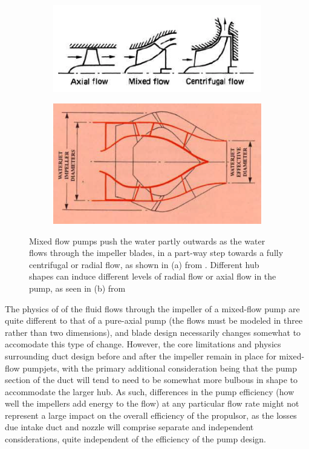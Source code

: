 \documentclass{article}\usepackage[]{graphicx}\usepackage[]{color}
\begin{document}
\begin{figure}[h]

\begin{subfigure}{0.5\textwidth}
\includegraphics[width=0.9\linewidth]{AxialMixed.png}
\caption{}
\end{subfigure}
\begin{subfigure}{0.5\textwidth}
\includegraphics[width=0.9\linewidth]{MixedHub.png}
\caption{}
\end{subfigure}

\caption{Mixed flow pumps push the water partly outwards as the water flows through the impeller blades, in a part-way step towards a fully centrifugal or radial flow, as shown in (a) from \cite{carlton2007}. Different hub shapes can induce different levels of radial flow or axial flow in the pump, as seen in (b) from \cite{hamilton1997}}
\label{fig:AxialMixedHub.png}
\end{figure}


The physics of of the fluid flows through the impeller of a mixed-flow pump are quite different to that of a pure-axial pump (the flows must be modeled in three rather than two dimensions), and blade design necessarily changes somewhat to accomodate this type of change.  However, the core limitations and physics surrounding duct design before and after the impeller remain in place for mixed-flow pumpjets, with the primary additional consideration being that the pump section of the duct will tend to need to be somewhat more bulbous in shape to accommodate the larger hub.  As such, differences in the pump efficiency (how well the impellers add energy to the flow) at any particular flow rate might not represent a large impact on the overall efficiency of the propulsor, as the losses due intake duct and nozzle will comprise separate and independent considerations, quite independent of the efficiency of the pump design.
\end{document}
